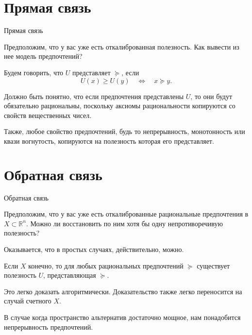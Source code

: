 \documentclass{beamer}
\begin{document}
\section{Прямая связь}

\begin{frame}{Прямая связь}

Предположим, что у вас уже есть откалиброванная полезность. Как вывести из нее модель предпочтений?

\begin{definition}
Будем говорить, что $U$ \alert{представляет} $\succcurlyeq$, если
$$ U(x) \geqslant U(y) \quad \Leftrightarrow \quad  x \succcurlyeq y.$$
\end{definition}

Должно быть понятно, что если предпочтения представлены $U$, то они будут обязательно рациональны, поскольку аксиомы рациональности копируются со свойств вещественных чисел. 

Также, любое свойство предпочтений, будь то непрерывность, монотонность или квази вогнутость, копируются на полезность которая его представляет.

\end{frame}

\section{Обратная связь}

\begin{frame}{Обратная связь}

Предположим, что у вас уже есть откалиброванные рациональные предпочтения в $X \subset \mathbb{R}^n$. Можно ли восстановить по ним хотя бы одну непротиворечивую полезность? 

Оказывается, что в простых случаях, действительно, можно.

\begin{lemma}
Если $X$ конечно, то для любых рациональных предпочтений $\succcurlyeq$ существует полезность $U$, представляющая $\succcurlyeq$.
\end{lemma}

Это легко доказать алгоритмически. Доказательство также легко переносится на случай счетного $X$.

В случае когда пространство альтернатив достаточно мощное, нам понадобится непрерывность предпочтений.

\end{frame}
\end{document}
